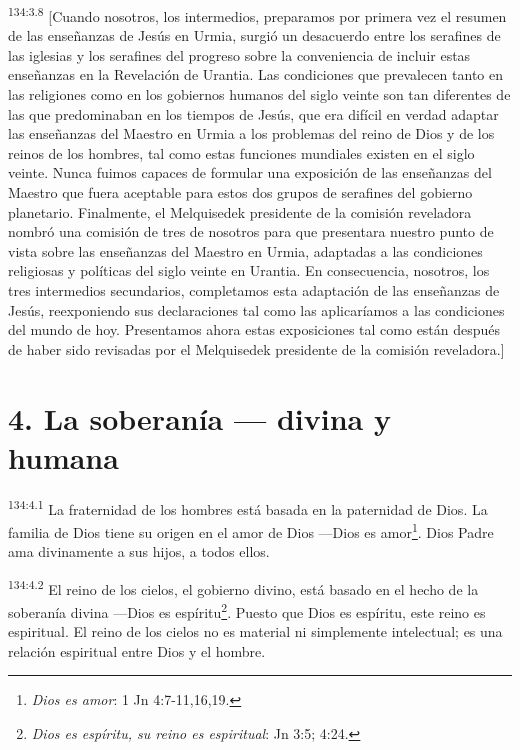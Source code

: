 \par 
\textsuperscript{134:3.8} [Cuando nosotros, los intermedios, preparamos por primera vez el resumen de las enseñanzas de Jesús en Urmia, surgió un desacuerdo entre los serafines de las iglesias y los serafines del progreso sobre la conveniencia de incluir estas enseñanzas en la Revelación de Urantia. Las condiciones que prevalecen tanto en las religiones como en los gobiernos humanos del siglo veinte son tan diferentes de las que predominaban en los tiempos de Jesús, que era difícil en verdad adaptar las enseñanzas del Maestro en Urmia a los problemas del reino de Dios y de los reinos de los hombres, tal como estas funciones mundiales existen en el siglo veinte. Nunca fuimos capaces de formular una exposición de las enseñanzas del Maestro que fuera aceptable para estos dos grupos de serafines del gobierno planetario. Finalmente, el Melquisedek presidente de la comisión reveladora nombró una comisión de tres de nosotros para que presentara nuestro punto de vista sobre las enseñanzas del Maestro en Urmia, adaptadas a las condiciones religiosas y políticas del siglo veinte en Urantia. En consecuencia, nosotros, los tres intermedios secundarios, completamos esta adaptación de las enseñanzas de Jesús, reexponiendo sus declaraciones tal como las aplicaríamos a las condiciones del mundo de hoy. Presentamos ahora estas exposiciones tal como están después de haber sido revisadas por el Melquisedek presidente de la comisión reveladora.]

\section*{4. La soberanía --- divina y humana}
\par 
\textsuperscript{134:4.1} La fraternidad de los hombres está basada en la paternidad de Dios. La familia de Dios tiene su origen en el amor de Dios ---Dios es amor\footnote{\textit{Dios es amor}: 1 Jn 4:7-11,16,19.}. Dios Padre ama divinamente a sus hijos, a todos ellos.

\par 
\textsuperscript{134:4.2} El reino de los cielos, el gobierno divino, está basado en el hecho de la soberanía divina ---Dios es espíritu\footnote{\textit{Dios es espíritu, su reino es espiritual}: Jn 3:5; 4:24.}. Puesto que Dios es espíritu, este reino es espiritual. El reino de los cielos no es material ni simplemente intelectual; es una relación espiritual entre Dios y el hombre.


